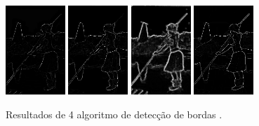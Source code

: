 \begin{figure}[!htb]
 \centering
 \def\baselinestretch{1}\small\normalsize
 \includegraphics[width=0.2\textwidth]{img/101087-77.jpg}\qquad
 \includegraphics[width=0.2\textwidth]{img/101087-80.jpg}  \qquad 
  \includegraphics[width=0.2\textwidth]{img/101087-82.jpg}  \qquad
 \includegraphics[width=0.2\textwidth]{img/101087-85.jpg}        
 \caption{\label{fig:indio}Resultados de 4 algoritmo de detec\c{c}\~{a}o de bordas \citep{berkeley}.}
\end{figure}



